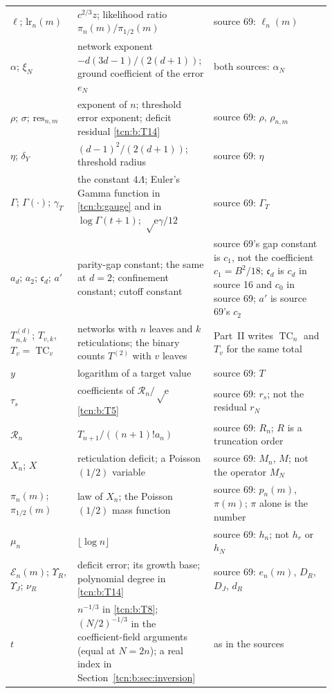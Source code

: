 \documentclass[11pt,letterpaper]{article}
\newcommand{\ee}{\mathrm e}
\newcommand{\TC}{\operatorname{TC}}
\theoremstyle{remark}
\begin{document}
\begin{longtable}{@{}>{\raggedright}p{0.2\linewidth}>{\raggedright}p{0.37\linewidth}>{\raggedright\arraybackslash}p{0.35\linewidth}@{}}
$\ell$; $\mathrm{lr}_n(m)$ & $c^{2/3}z$; likelihood ratio $\pi_n(m)/\pi_{1/2}(m)$ & source 69: $\ell_n(m)$\\
$\alpha$; $\xi_N$ & network exponent $-d(3d-1)/(2(d+1))$; ground coefficient of the error $e_N$ & both sources: $\alpha_N$\\
$\rho$; $\sigma$; $\mathrm{res}_{n,m}$ & exponent of $n$; threshold error exponent; deficit residual \eqref{tcn:b:T14} & source 69: $\rho$, $\rho_{n,m}$\\
$\eta$; $\delta_Y$ & $(d-1)^2/(2(d+1))$; threshold radius & source 69: $\eta$\\
$\Gamma$; $\Gamma(\cdot)$; $\gamma_T$ & the constant $4\Lambda$; Euler's Gamma function in \eqref{tcn:b:gauge} and in $\log\Gamma(t+1)$; $\sqrt\ee\gamma/12$ & source 69: $\Gamma_T$\\
$a_d$; $a_2$; $\mathfrak c_d$; $a'$ & parity-gap constant; the same at $d=2$; confinement constant; cutoff constant & source 69's gap constant is $c_1$, not the coefficient $c_1=B^2/18$; $\mathfrak c_d$ is $c_d$ in source 16 and $c_0$ in source 69; $a'$ is source 69's $c_2$\\
$T^{(d)}_{n,k}$; $T_{v,k}$, $T_v=\TC_v$ & networks with $n$ leaves and $k$ reticulations; the binary counts $T^{(2)}$ with $v$ leaves & Part~II writes $\TC_n$ and $T_v$ for the same total\\
$y$ & logarithm of a target value & source 69: $T$\\
$\tau_s$ & coefficients of $\mathcal R_n/\sqrt\ee$ \eqref{tcn:b:T5} & source 69: $r_s$; not the residual $r_N$\\
$\mathcal R_n$ & $T_{n+1}/((n+1)!a_n)$ & source 69: $R_n$; $R$ is a truncation order\\
$X_n$; $X$ & reticulation deficit; a Poisson$(1/2)$ variable & source 69: $M_n$, $M$; not the operator $M_N$\\
$\pi_n(m)$; $\pi_{1/2}(m)$ & law of $X_n$; the Poisson$(1/2)$ mass function & source 69: $p_n(m)$, $\pi(m)$; $\pi$ alone is the number\\
$\mu_n$ & $\lfloor\log n\rfloor$ & source 69: $h_n$; not $h_r$ or $h_N$\\
$\mathcal E_n(m)$; $\Upsilon_R$, $\Upsilon_J$; $\nu_R$ & deficit error; its growth base; polynomial degree in \eqref{tcn:b:T14} & source 69: $e_n(m)$, $D_R$, $D_J$, $d_R$\\
$t$ & $n^{-1/3}$ in \eqref{tcn:b:T8}; $(N/2)^{-1/3}$ in the coefficient-field arguments (equal at $N=2n$); a real index in Section~\ref{tcn:b:sec:inversion} & as in the sources\\
\bottomrule
\end{longtable}
\endgroup
\end{document}
